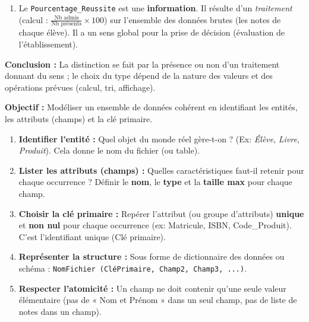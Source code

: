 \documentclass[11pt]{article}
\newcommand{\cle}[1]{{\popxbold\color{popdark}#1}}
\begin{document}
\begin{exoresolu}
\begin{enumerate}
\begin{center}
\begin{tabularx}{\linewidth}{|l|X|l|}
        \end{tabularx}
        \end{center}
        \item Le \texttt{Pourcentage\_Reussite} est une \textbf{information}. Il résulte d'un \emph{traitement} (calcul : $\frac{\text{Nb admis}}{\text{Nb présents}} \times 100$) sur l'ensemble des données brutes (les notes de chaque élève). Il a un sens global pour la prise de décision (évaluation de l'établissement).
    \end{enumerate}
    \textbf{Conclusion :} La distinction se fait par la présence ou non d'un traitement donnant du sens ; le choix du type dépend de la nature des valeurs et des opérations prévues (calcul, tri, affichage).
\end{exoresolu}

\begin{methode}
    \textbf{Objectif :} Modéliser un ensemble de données cohérent en identifiant les entités, les attributs (champs) et la clé primaire.
    \begin{enumerate}
        \item \textbf{Identifier l'entité :} Quel objet du monde réel gère-t-on ? (Ex: \emph{Élève}, \emph{Livre}, \emph{Produit}). Cela donne le nom du \cle{fichier} (ou table).
        \item \textbf{Lister les attributs (champs) :} Quelles caractéristiques faut-il retenir pour chaque occurrence ? Définir le \textbf{nom}, le \textbf{type} et la \textbf{taille max} pour chaque champ.
        \item \textbf{Choisir la clé primaire :} Repérer l'attribut (ou groupe d'attributs) \textbf{unique} et \textbf{non nul} pour chaque occurrence (ex: Matricule, ISBN, Code\_Produit). C'est l'identifiant unique (\cle{Clé primaire}).
        \item \textbf{Représenter la structure :} Sous forme de dictionnaire des données ou schéma : \texttt{NomFichier (CléPrimaire, Champ2, Champ3, ...)}.
        \item \textbf{Respecter l'atomicité :} Un champ ne doit contenir qu'une seule valeur élémentaire (pas de « Nom et Prénom » dans un seul champ, pas de liste de notes dans un champ).
    \end{enumerate}
\end{methode}
\end{document}
